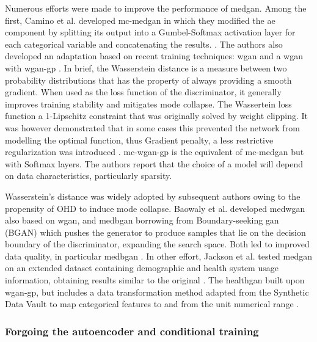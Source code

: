             Numerous efforts were made to improve the performance of \gls{medgan}. Among the first, Camino et al. developed \gls{mc-medgan} in which they modified the \gls{ae} component by splitting its output into a Gumbel-Softmax \cite{jang2016categorical} activation layer for each categorical variable and concatenating the results. \cite{Camino2018-re}. The authors also developed an adaptation based on recent training techniques: \gls{wgan} \cite{arjovsky2017wasserstein} and a \gls{wgan} with \gls{wgan-gp} \cite{gulrajani2017improved}. In brief, the Wasserstein distance is a measure between two probability distributions that has the property of always providing a smooth gradient. When used as the loss function of the discriminator, it generally improves training stability and mitigates mode collapse. The Wassertein loss function a 1-Lipschitz constraint that was originally solved by weight clipping. It was however demonstrated that in some cases this prevented the network from modelling the optimal function, thus Gradient penalty, a less restrictive regularization was introduced \cite{Petzka2018}. \gls{mc-wgan-gp} is the equivalent of \gls{mc-medgan} but with Softmax layers. The authors report that the choice of a model will depend on data characteristics, particularly sparsity.\par
            
            Wasserstein's distance was widely adopted by subsequent authors owing to the propensity of OHD to induce mode collapse. Baowaly et al. developed \gls{medwgan} also based on \gls{wgan}, and \gls{medbgan} borrowing from Boundary-seeking \gls{gan} (BGAN) \cite{hjelm2017boundaryseeking} which pushes the generator to produce samples that lie on the decision boundary of the discriminator, expanding the search space. Both led to improved data quality, in particular \gls{medbgan} \cite{baowaly_2019_IEEE,baowaly_2019_jamia}. In other effort, Jackson et al. tested \gls{medgan} on an extended dataset containing demographic and health system usage information, obtaining results similar to the original \cite{Jackson_2019}. The \gls{healthgan} built upon \gls{wgan-gp}, but includes a data transformation method adapted from the Synthetic Data Vault \cite{Patki_2016} to map categorical features to and from the unit numerical range \cite{Yale_2020}. 
        
        \subsubsection{Forgoing the autoencoder and conditional training}\label{noauto}

